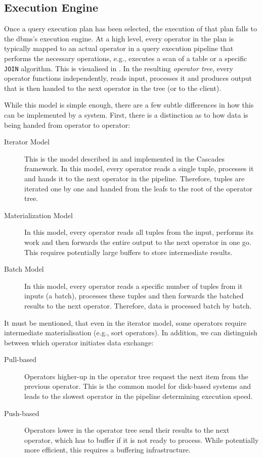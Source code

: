 \subsection{Execution Engine}

Once a query execution plan has been selected, the execution of that plan falls to the \acrshort{dbms}'s execution engine. At a high level, every operator in the plan is typically mapped to an actual operator in a query execution pipeline that performs the necessary operations, e.g., executes a scan of a table or a specific \texttt{JOIN} algorithm. This is visualised in . In the resulting \emph{operator tree}, every operator functions independently, reads input, processes it and produces output that is then handed to the next operator in the tree (or to the client).

While this model is simple enough, there are a few subtle differences in how this can be implemented by a system. First, there is a distinction as to how data is being handed from operator to operator:

\begin{description}
    \item[Iterator Model] This is the model described in \cite{Graefe:1993Volcano,Graefe:1993Query} and implemented in the Cascades \cite{Graefe:1995Cascades} framework. In this model, every operator reads a single tuple, processes it and hands it to the next operator in the pipeline. Therefore, tuples are iterated one by one and handed from the leafs to the root of the operator tree.
    \item[Materialization Model] In this model, every operator reads all tuples from the input, performs its work and then forwards the entire output to the next operator in one go. This requires potentially large buffers to store intermediate results.
    \item[Batch Model] In this model, every operator reads a specific number of tuples from it inputs (a batch), processes these tuples and then forwards the batched results to the next operator. Therefore, data is processed batch by batch.
\end{description}

It must be mentioned, that even in the iterator model, some operators require intermediate materialisation (e.g., sort operators). In addition, we can distinguish between which operator initiates data exchange:

\begin{description}
    \item[Pull-based] Operators higher-up in the operator tree request the next item from the previous operator. This is the common model for disk-based systems and leads to the slowest operator in the pipeline determining execution speed.
    \item[Push-based] Operators lower in the operator tree send their results to the next operator, which has to buffer if it is not ready to process. While potentially more efficient, this requires a buffering infrastructure.
\end{description}

